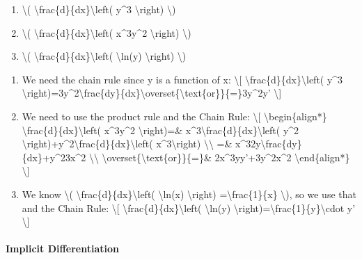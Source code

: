 \begin{enumerate}
\tightlist
\item
  \textbackslash{}( \textbackslash{}frac\{d\}\{dx\}\textbackslash{}left(
  y\^{}3 \textbackslash{}right) \textbackslash{})
\item
  \textbackslash{}( \textbackslash{}frac\{d\}\{dx\}\textbackslash{}left(
  x\^{}3y\^{}2 \textbackslash{}right) \textbackslash{})
\item
  \textbackslash{}( \textbackslash{}frac\{d\}\{dx\}\textbackslash{}left(
  \textbackslash{}ln(y) \textbackslash{}right) \textbackslash{})
\end{enumerate}

\begin{enumerate}
\tightlist
\item
  We need the chain rule since y is a function of x: \textbackslash{}{[}
  \textbackslash{}frac\{d\}\{dx\}\textbackslash{}left( y\^{}3
  \textbackslash{}right)=3y\^{}2\textbackslash{}frac\{dy\}\{dx\}\textbackslash{}overset\{\textbackslash{}text\{or\}\}\{=\}3y\^{}2y'
  \textbackslash{}{]}
\item
  We need to use the product rule and the Chain Rule:
  \textbackslash{}{[} \textbackslash{}begin\{align*\}
  \textbackslash{}frac\{d\}\{dx\}\textbackslash{}left( x\^{}3y\^{}2
  \textbackslash{}right)=\&
  x\^{}3\textbackslash{}frac\{d\}\{dx\}\textbackslash{}left( y\^{}2
  \textbackslash{}right)+y\^{}2\textbackslash{}frac\{d\}\{dx\}\textbackslash{}left(
  x\^{}3\textbackslash{}right) \textbackslash{}\textbackslash{} =\&
  x\^{}32y\textbackslash{}frac\{dy\}\{dx\}+y\^{}23x\^{}2
  \textbackslash{}\textbackslash{}
  \textbackslash{}overset\{\textbackslash{}text\{or\}\}\{=\}\&
  2x\^{}3yy'+3y\^{}2x\^{}2 \textbackslash{}end\{align*\}
  \textbackslash{}{]}
\item
  We know \textbackslash{}(
  \textbackslash{}frac\{d\}\{dx\}\textbackslash{}left(
  \textbackslash{}ln(x) \textbackslash{}right)
  =\textbackslash{}frac\{1\}\{x\} \textbackslash{}), so we use that and
  the Chain Rule: \textbackslash{}{[}
  \textbackslash{}frac\{d\}\{dx\}\textbackslash{}left(
  \textbackslash{}ln(y)
  \textbackslash{}right)=\textbackslash{}frac\{1\}\{y\}\textbackslash{}cdot
  y' \textbackslash{}{]}
\end{enumerate}

\hypertarget{implicit-differentiation-1}{%
\paragraph{Implicit Differentiation}\label{implicit-differentiation-1}}

